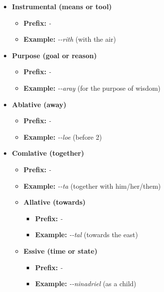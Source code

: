 \documentclass[letterpaper,twocolumn,openany,nodeprecatedcode,hidelinks]{dndbook}
\begin{document}
{\begin{itemize}
\begin{itemize}
        \item \textbf{Prefix:} \textit{\CAtem-}
        \item \textbf{Example:} \textit{\CAtem-\CLab-loe} (at two o'clock)
    \end{itemize}
    \item \textbf{Instrumental (means or tool)}
    \begin{itemize}
        \item \textbf{Prefix:} \textit{\CAins-}
        \item \textbf{Example:} \textit{\CAins-\CLin-rith} (with the air)
    \end{itemize}
        \item \textbf{Purpose (goal or reason)}
    \begin{itemize}
        \item \textbf{Prefix:} \textit{\CApur-}
        \item \textbf{Example:} \textit{\CApur-\CLab-aray} (for the purpose of wisdom)
    \end{itemize}

    \item \textbf{Ablative (away)}
    \begin{itemize}
        \item \textbf{Prefix:} \textit{\CAabl-}
        \item \textbf{Example:} \textit{\CAabl-\CLab-loe} (before 2)
    \end{itemize}

     \item \textbf{Comlative (together)}
    \begin{itemize}
        \item \textbf{Prefix:} \textit{\CAcom-}
        \item \textbf{Example:} \textit{\CAcom-\CLan-ta} (together with him/her/them)

             \item \textbf{Allative (towards)}
    \begin{itemize}
        \item \textbf{Prefix:} \textit{\CAall-}
        \item \textbf{Example:} \textit{\CAall-\CLan-tal} (towards the east)
    \end{itemize}
        

     \item \textbf{Essive (time or state)}
    \begin{itemize}
        \item \textbf{Prefix:} \textit{\CAess-}
        \item \textbf{Example:} \textit{\CAess-\CLan-ninadriel} (as a child)
    \end{itemize}



\end{itemize}
\end{itemize}}
\end{document}
